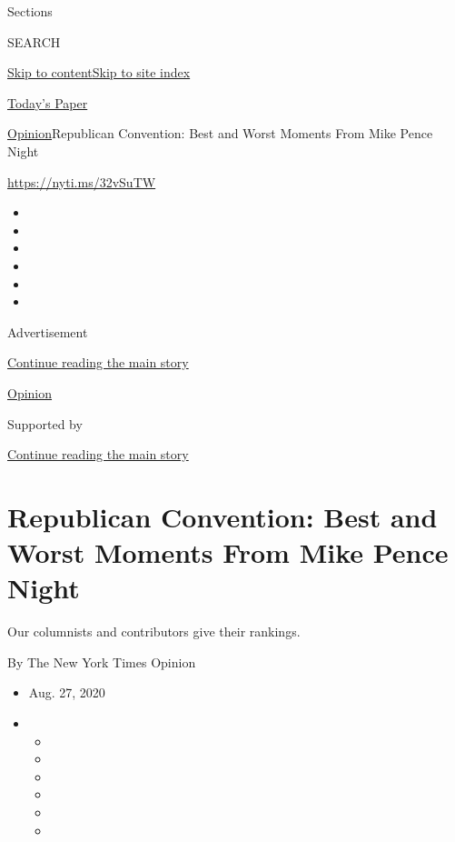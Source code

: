Sections

SEARCH

\protect\hyperlink{site-content}{Skip to
content}\protect\hyperlink{site-index}{Skip to site index}

\href{https://myaccount.nytimes3xbfgragh.onion/auth/login?response_type=cookie\&client_id=vi}{}

\href{https://www.nytimes3xbfgragh.onion/section/todayspaper}{Today's
Paper}

\href{/section/opinion}{Opinion}\textbar{}Republican Convention: Best
and Worst Moments From Mike Pence Night

\url{https://nyti.ms/32vSuTW}

\begin{itemize}
\item
\item
\item
\item
\item
\item
\end{itemize}

Advertisement

\protect\hyperlink{after-top}{Continue reading the main story}

\href{/section/opinion}{Opinion}

Supported by

\protect\hyperlink{after-sponsor}{Continue reading the main story}

\hypertarget{republican-convention-best-and-worst-moments-from-mike-pence-night}{%
\section{Republican Convention: Best and Worst Moments From Mike Pence
Night}\label{republican-convention-best-and-worst-moments-from-mike-pence-night}}

Our columnists and contributors give their rankings.

By The New York Times Opinion

\begin{itemize}
\item
  Aug. 27, 2020
\item
  \begin{itemize}
  \item
  \item
  \item
  \item
  \item
  \item
  \end{itemize}
\end{itemize}

